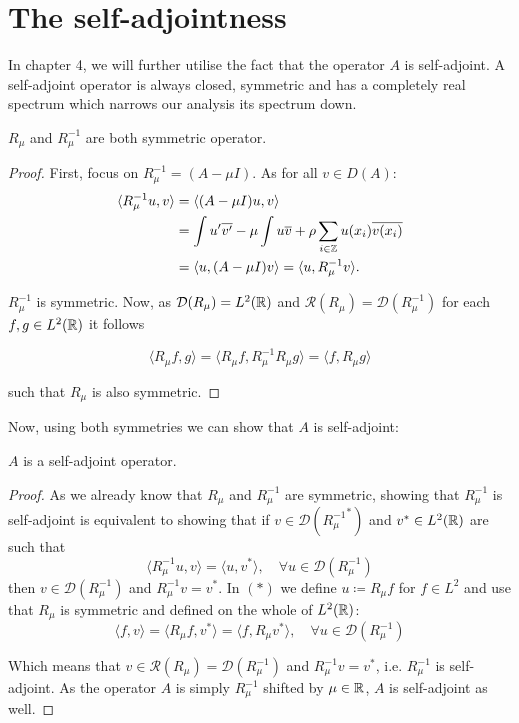 \section{The self-adjointness}

In chapter 4, we will further utilise the fact that the operator $A$ is self-adjoint. A self-adjoint operator is always closed, symmetric and has a completely real spectrum which narrows our analysis its spectrum down. 

\begin{theorem} \label{2.2:thm-RmuSymmetric}
	$R_{\mu}$ and $R_{\mu}^{-1}$ are both symmetric operator.
	
	\begin{proof}
		First, focus on $R_{\mu}^{-1} = (A - \mu I)$. As for all $v \in D(A)$:
			\begin{align*}
				\langle R_{\mu}^{-1} u, v \rangle & = \langle (A - \mu I) u, v \rangle \\
					& = \int u'\overline{v'} -  \mu \int u \overline{v} + \rho \sum_{i \in \mathbb{Z}} u(x_{i}) \overline{v(x_{i})} \\
					& = \langle u, (A - \mu I) v \rangle = \langle u,  R_{\mu}^{-1} v \rangle.
			\end{align*}

		$R_{\mu}^{-1}$ is symmetric. Now, as $\mathcal{D}(R_{\mu}) = L^{2}(\mathbb{R})$ and $\mathcal{R}(R_{\mu}) = \mathcal{D}(R_{\mu}^{-1})$ for each $f, g \in L^{2}(\mathbb{R})$ it follows
		
		\[  \langle R_{\mu} f, g \rangle =  \langle R_{\mu} f, R_{\mu}^{-1} R_{\mu} g \rangle = \langle f, R_{\mu} g \rangle \]
		
		such that $R_{\mu}$ is also symmetric.
	\end{proof}
\end{theorem}

Now, using both symmetries we can show that $A$ is self-adjoint:

\begin{theorem} \label{2.3:thm-ASelfAdjoint}
	$A$ is a self-adjoint operator.
		
	\begin{proof}
		As we already know that $R_{\mu}$ and $R_{\mu}^{-1}$ are symmetric, showing that $R_{\mu}^{-1}$ is self-adjoint is equivalent to showing that if $v \in \mathcal{D}({R_{\mu}^{-1}}^{*})$ and $v^{*} \in L^{2}(\mathbb{R})$ are such that
		\[ \langle R_{\mu}^{-1} u, v \rangle = \langle u, v^{*} \rangle, \quad \forall u \in \mathcal{D}(R_{\mu}^{-1}) \tag*{(*)} \]
		then $v \in \mathcal{D}(R_{\mu}^{-1})$ and $R_{\mu}^{-1} v = v^{*}$.
		In $(*)$ we define $u \coloneqq R_{\mu} f$ for $f \in L^{2}$ and use that $R_{\mu}$ is symmetric and defined on the whole of $L^{2}(\mathbb{R})$:
		\[  \langle f, v \rangle = \langle R_{\mu} f, v^{*} \rangle = \langle f, R_{\mu} v^{*} \rangle, \quad \forall u \in \mathcal{D}(R_{\mu}^{-1}) \]
		
		Which means that $v \in \mathcal{R}(R_{\mu}) = \mathcal{D}(R_{\mu}^{-1})$ and $R_{\mu}^{-1} v = v^{*}$, i.e. $R_{\mu}^{-1}$ is self-adjoint. As the operator $A$ is simply $R_{\mu}^{-1}$ shifted by $\mu \in \mathbb{R}$, $A$ is self-adjoint as well.		
	\end{proof}
\end{theorem}